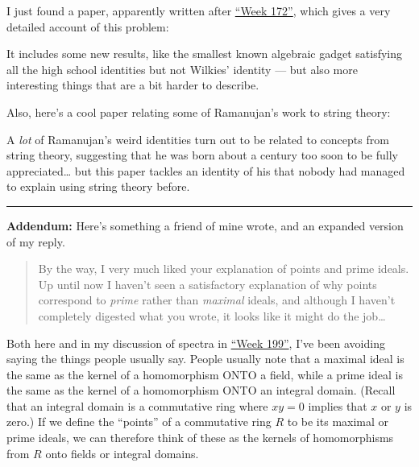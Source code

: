 \documentclass{article}
\def\tightlist{}
\renewcommand{\texttt}[1]{%
  \begingroup
  \ttfamily
  \begingroup\lccode`~=`/\lowercase{\endgroup\def~}{/\discretionary{}{}{}}%
  \begingroup\lccode`~=`[\lowercase{\endgroup\def~}{[\discretionary{}{}{}}%
  \begingroup\lccode`~=`.\lowercase{\endgroup\def~}{.\discretionary{}{}{}}%
  \catcode`/=\active\catcode`[=\active\catcode`.=\active
  \scantokens{#1\noexpand}%
  \endgroup
}
\begin{document}
I just found a paper, apparently written after
\protect\hyperlink{week172}{``Week 172''}, which gives a very detailed
account of this problem:


It includes some new results, like the smallest known algebraic gadget
satisfying all the high school identities but not Wilkies' identity ---
but also more interesting things that are a bit harder to describe.

Also, here's a cool paper relating some of Ramanujan's work to string
theory:


A \emph{lot} of Ramanujan's weird identities turn out to be related to
concepts from string theory, suggesting that he was born about a century
too soon to be fully appreciated\ldots{} but this paper tackles an
identity of his that nobody had managed to explain using string theory
before.

\begin{center}\rule{0.5\linewidth}{0.5pt}\end{center}

\textbf{Addendum:} Here's something a friend of mine wrote, and an
expanded version of my reply.

\begin{quote}
By the way, I very much liked your explanation of points and prime
ideals. Up until now I haven't seen a satisfactory explanation of why
points correspond to \emph{prime} rather than \emph{maximal} ideals, and
although I haven't completely digested what you wrote, it looks like it
might do the job\ldots{}
\end{quote}

Both here and in my discussion of spectra in
\protect\hyperlink{week199}{``Week 199''}, I've been avoiding saying the
things people usually say. People usually note that a maximal ideal is
the same as the kernel of a homomorphism ONTO a field, while a prime
ideal is the same as the kernel of a homomorphism ONTO an integral
domain. (Recall that an integral domain is a commutative ring where
\(xy = 0\) implies that \(x\) or \(y\) is zero.) If we define the
``points'' of a commutative ring \(R\) to be its maximal or prime
ideals, we can therefore think of these as the kernels of homomorphisms
from \(R\) onto fields or integral domains.
\end{document}
